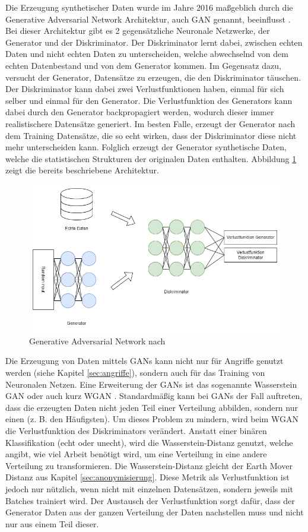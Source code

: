 Die Erzeugung synthetischer Daten wurde im Jahre 2016 maßgeblich durch die Generative Adversarial Network Architektur, auch GAN genannt, beeinflusst \cite{P-86}. 
Bei dieser Architektur gibt es 2 gegensätzliche Neuronale Netzwerke, der Generator und der Diskriminator. 
Der Diskriminator lernt dabei, zwischen echten Daten und nicht echten Daten zu unterscheiden, welche abwechselnd von dem echten Datenbestand und von dem Generator kommen.
Im Gegensatz dazu, versucht der Generator, Datensätze zu erzeugen, die den Diskriminator täuschen. 
Der Diskriminator kann dabei zwei Verlustfunktionen haben, einmal für sich selber und einmal für den Generator.
Die Verlustfunktion des Generators kann dabei durch den Generator backpropagiert werden, wodurch dieser immer realistischere Datensätze generiert.
Im besten Falle, erzeugt der Generator nach dem Training Datensätze, die so echt wirken, dass der Diskriminator diese nicht mehr unterscheiden kann.
Folglich erzeugt der Generator synthetische Daten, welche die statistischen Strukturen der originalen Daten enthalten.
Abbildung \ref{fig:gan} zeigt die bereits beschriebene Architektur.

\begin{figure}[!htb]
    \centering
    \includegraphics[width=14cm]{figures/gan}
    \caption{Generative Adversarial Network nach \cite{P-86}}
    \label{fig:gan}
\end{figure} 

Die Erzeugung von Daten mittels GANs kann nicht nur für Angriffe genutzt werden (siehe Kapitel \ref{sec:angriffe}), sondern auch für das Training von Neuronalen Netzen.
Eine Erweiterung der GANs ist das sogenannte Wasserstein GAN oder auch kurz WGAN \cite{P-92}. 
Standardmäßig kann bei GANs der Fall auftreten, dass die erzeugten Daten nicht jeden Teil einer Verteilung abbilden, sondern nur einen (z. B. den Häufigsten).
Um dieses Problem zu mindern, wird beim WGAN die Verlustfunktion des Diskriminators verändert. 
Anstatt einer binären Klassifikation (echt oder unecht), wird die Wasserstein-Distanz genutzt, welche angibt, wie viel Arbeit benötigt wird, um eine Verteilung in eine andere Verteilung zu transformieren. 
Die Wasserstein-Distanz gleicht der Earth Mover Distanz aus Kapitel \ref{sec:anonymisierung}.
Diese Metrik als Verlustfunktion ist jedoch nur nützlich, wenn nicht mit einzelnen Datensätzen, sondern jeweils mit Batches trainiert wird.
Der Austausch der Verlustfunktion sorgt dafür, dass der Generator Daten aus der ganzen Verteilung der Daten nachstellen muss und nicht nur aus einem Teil dieser.



